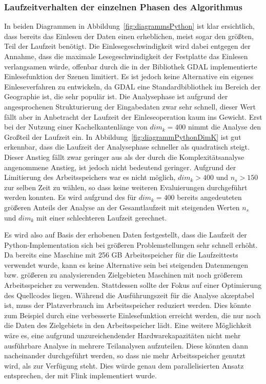 \subsubsection{Laufzeitverhalten der einzelnen Phasen des Algorithmus}
In beiden Diagrammen in Abbildung~\ref{fig:diagrammsPython} ist klar ersichtlich, dass bereits das Einlesen der Daten einen erheblichen, meist sogar den größten, Teil der Laufzeit benötigt. Die Einlesegeschwindigkeit wird dabei entgegen der Annahme, dass die maximale Lesegeschwindigkeit der Festplatte das Einlesen verlangsamen würde, offenbar durch die in der Bibliothek GDAL implementierte Einlesefunktion der Szenen limitiert. Es ist jedoch keine Alternative ein eigenes Einleseverfahren zu entwickeln, da GDAL eine Standardbibliothek im Bereich der Geographie ist, die sehr populär ist. Die Analysephase ist aufgrund der angesprochenen Strukturierung der Eingabedaten zwar sehr schnell, dieser Wert fällt aber in Anbetracht der Laufzeit der Einleseoperation kaum ins Gewicht. Erst bei der Nutzung einer Kachelkantenlänge von $dim_k = 400$ nimmt die Analyse den Großteil der Laufzeit ein. In Abbildung~\ref{fig:diagrammPythonDimK}  ist gut erkennbar, dass die Laufzeit der Analysephase schneller als quadratisch steigt. Dieser Anstieg fällt zwar geringer aus als der durch die Komplexitätsanalyse angenommene Anstieg, ist jedoch nicht bedeutend geringer. Aufgrund der Limitierung des Arbeitsspeichers war es nicht möglich, $dim_k > 400$ und $n_s > 150$ zur selben Zeit zu wählen, so dass keine weiteren Evaluierungen durchgeführt werden konnten. Es wird aufgrund des für $dim_k = 400$ bereits angedeuteten größeren Anteils der Analyse an der Gesamtlaufzeit mit steigenden Werten $n_s$ und $dim_k$ mit einer schlechteren Laufzeit gerechnet. 

Es wird also auf Basis der erhobenen Daten festgestellt, dass die Laufzeit der Python-Implementation sich bei größeren Problemstellungen sehr schnell erhöht. Da bereits eine Maschine mit 256 GB Arbeitsspeicher für die Laufzeittests verwendet wurde, kann es keine Alternative sein bei steigenden Datenmengen bzw. größeren zu analysierenden Zielgebieten Maschinen mit noch größerem Arbeitsspeicher zu verwenden. Stattdessen sollte der Fokus auf einer Optimierung des Quellcodes liegen. Während die Ausführungszeit für die Analyse akzeptabel ist, muss der Platzverbrauch im Arbeitsspeicher reduziert werden. Dies könnte zum Beispiel durch eine verbesserte Einlesefunktion erreicht werden, die nur noch die Daten des Zielgebiets in den Arbeitsspeicher lädt. Eine weitere Möglichkeit wäre es, eine aufgrund unzureichendender Hardwarekapazitäten nicht mehr ausführbare Analyse in mehrere Teilanalysen aufzuteilen. Diese könnten dann nacheinander durchgeführt werden, so dass nie mehr Arbeitsspeicher genutzt wird, als zur Verfügung steht. Dies würde genau dem parallelisierten Ansatz entsprechen, der mit Flink implementiert wurde.


